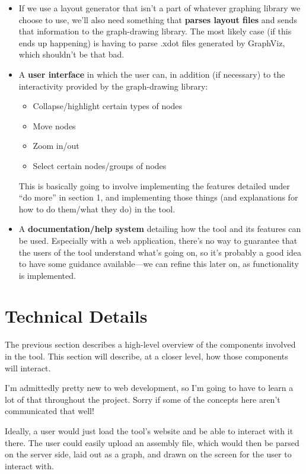 \documentclass[12pt]{article}
\begin{document}
\begin{itemize}
\item If we use a layout generator that isn't a part of whatever graphing
	library we choose to use, we'll also need something that \textbf{parses
		layout files} and sends that information to the graph-drawing
	library. The most likely case (if this ends up happening) is having
	to parse .xdot files generated by GraphViz, which shouldn't be
		that bad.
	\item A \textbf{user interface} in which the user can, in addition (if necessary) to the
	interactivity provided by the graph-drawing library:
	\begin{itemize}
	\item Collapse/highlight certain types of nodes
	\item Move nodes
	\item Zoom in/out
	\item Select certain nodes/groups of nodes
	\end{itemize}
	This is basically going to involve implementing the features
	detailed under ``do more'' in section 1, and implementing those
	things (and explanations for how to do them/what they do) in the
	tool.
	\item A \textbf{documentation/help system} detailing how the tool
		and its features can be used. Especially with a web
		application, there's no way to guarantee that the users of
		the tool understand what's going on, so it's probably a good
		idea to have some guidance available---we can refine this
		later on, as functionality is implemented.
\end{itemize}

\section{Technical Details}

The previous section describes a high-level overview of the components
involved in the tool. This section will describe, at a closer level,
how those components will interact.

I'm admittedly pretty new to web development, so I'm going to have to learn
a lot of that throughout the project. Sorry if some of the concepts here
aren't communicated that well!

Ideally, a user would just load the tool's website and be able to
	interact with it there. The user could easily upload an assembly
	file, which would then be parsed on
	the server side, laid out as a graph, and drawn on the screen for
	the user to interact with.
\end{document}
